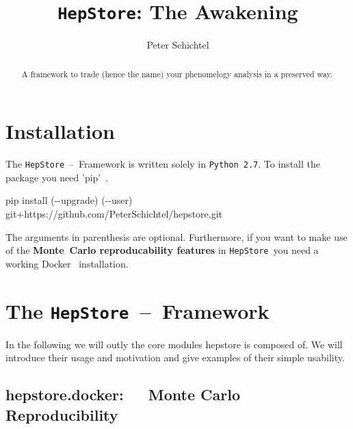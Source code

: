 \documentclass[aps,prd,11pt,tightenlines,superscriptaddress,nofootinbib,preprintnumbers,notitlepage]{revtex4-1}
\newcommand{\hepstore}{\texttt{HepStore}}
\newcommand{\python}{\texttt{Python~2.7}}
\begin{document}
\title{{\bf\Huge\hepstore: The Awakening}}


\author{Peter Schichtel}


\begin{abstract}
  A framework to trade (hence the name) your phenomelogy analysis in a preserved way. 
\end{abstract}

\maketitle

\bigskip 
\bigskip 

\tableofcontents 

\newpage


\section{Installation}
\label{sec:installation}

The \hepstore~--~Framework is written solely in \python. To install
the package you need 'pip'~\cite{}.
%
\begin{framed}
  \begin{center}
    pip install (-{}-upgrade) (-{}-user) git+https://github.com/PeterSchichtel/hepstore.git
  \end{center}
\end{framed}
%
The arguments in parenthesis are optional. Furthermore, if you want to
make use of the {\bf Monte~Carlo reproducability features} in
\hepstore~you need a working Docker~\cite{} installation.

\section{The \hepstore~--~Framework}
\label{sec:framework}

In the following we will outly the core modules hepstore is composed
of. We will introduce their usage and motivation and give examples of
their simple usability.

\subsection{hepstore.docker:~~~Monte Carlo Reproducibility}
\end{document}
